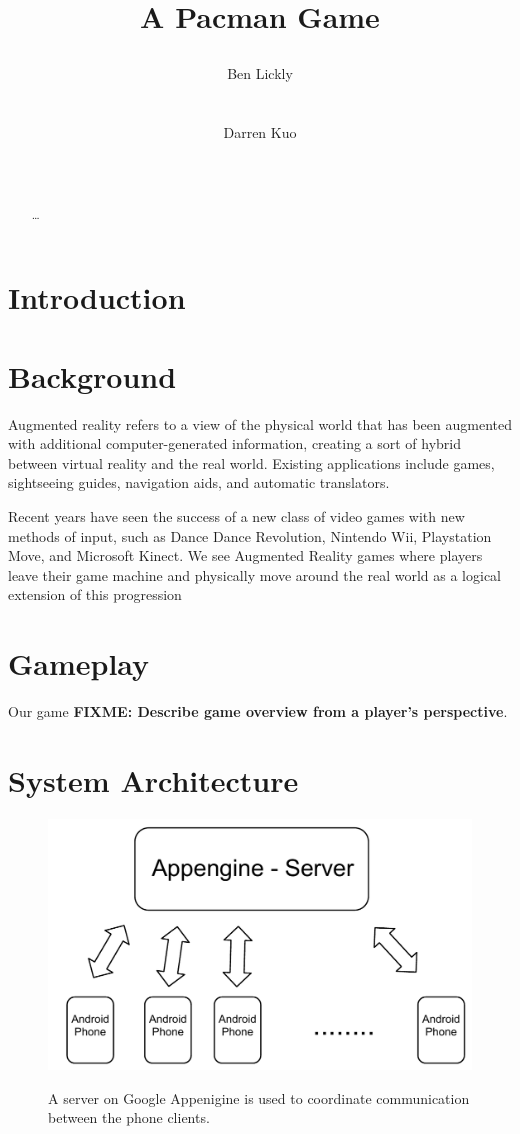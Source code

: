 \documentclass{acm_proc_article-sp}
\title{A Pacman Game
\numberofauthors{2}
\author{
\alignauthor Ben Lickly \\
       \affaddr{University of California, Berkeley}\\
       \affaddr{Berkeley, CA, USA} \\
       \email{blickly@eecs.berkeley.edu}
\alignauthor Darren Kuo \\
       \affaddr{University of California, Berkeley}\\
       \affaddr{Berkeley, CA, USA} \\
       \email{darrenkuo@eecs.berkeley.edu}
}
}
\newcommand{\FIXME}[1]{{\color{red}\textbf{FIXME: #1}}}
\begin{document}
\maketitle

\begin{abstract}
\ldots
\cite{ZombieRun}
\end{abstract}

\section{Introduction}
\section{Background}
Augmented reality refers to a view of the physical world that has been
augmented with additional computer-generated information, creating a
sort of hybrid between virtual reality and the real world. Existing
applications include games, sightseeing guides, navigation aids, and
automatic translators.

Recent years have seen the success of a new class of video games with
new methods of input, such as Dance Dance Revolution, Nintendo Wii,
Playstation Move, and Microsoft Kinect. We see Augmented Reality games
where players leave their game machine and physically move around the
real world as a logical extension of this progression

\section{Gameplay}
Our game \FIXME{Describe game overview from a player's perspective}.

\section{System Architecture}

\begin{figure}
\centering
\includegraphics[scale=0.4]{figs/ServerArchitecture}
\label{fig:ServerArchitecture}
\caption{A server on Google Appenigine is used to coordinate communication between the phone clients.}
\end{figure}
\end{document}
